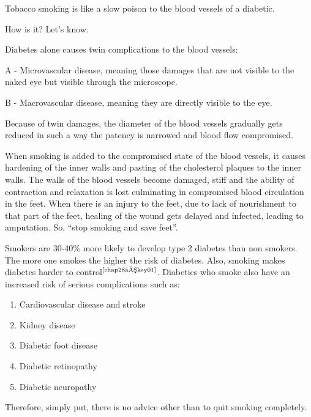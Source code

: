 Tobacco smoking is like a slow poison to the blood vessels of a diabetic.

How is it? Let’s know.

Diabetes alone causes twin complications to the blood vessels:

A - Microvascular disease, meaning those damages that are not visible to the naked eye but visible through the microscope.

B - Macrovascular disease, meaning they are directly visible to the eye.

Because of twin damages, the diameter of the blood vessels gradually gets reduced in such a way the patency is narrowed and blood flow compromised.

When smoking is added to the compromised state of the blood vessels, it causes hardening of the inner walls and pasting of the cholesterol plaques to the inner walls. The walls of the blood vessels become damaged, stiff and the ability of contraction and relaxation is lost culminating in compromised blood circulation in the feet. When there is an injury to the feet, due to lack of nourishment to that part of the feet, healing of the wound gets delayed and infected, leading to amputation. So, “stop smoking and save feet”.

Smokers are 30-40\% more likely to develop type 2 diabetes than non smokers. The more one smokes the higher the risk of diabetes.  Also, smoking makes diabetes harder to control$^{\text{\cite{chap28–key01}}}$. Diabetics who smoke also have an increased risk of serious complications such as:

\begin{enumerate}[•]
\itemsep=0pt
\item Cardiovascular disease and stroke
\item Kidney disease
\item Diabetic foot disease
\item Diabetic retinopathy
\item Diabetic neuropathy
\end{enumerate}

Therefore, simply put, there is no advice other than to quit smoking completely.

